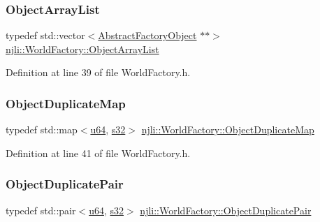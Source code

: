 \subsubsection{\texorpdfstring{Object\+Array\+List}{ObjectArrayList}}
{\footnotesize\ttfamily typedef std\+::vector$<$\mbox{\hyperlink{classnjli_1_1_abstract_factory_object}{Abstract\+Factory\+Object}} $\ast$$\ast$$>$ \mbox{\hyperlink{classnjli_1_1_world_factory_a0b1357052d11887d1561fbd882acd177}{njli\+::\+World\+Factory\+::\+Object\+Array\+List}}}



Definition at line 39 of file World\+Factory.\+h.

\mbox{\label{classnjli_1_1_world_factory_a15eec8c4710c8ec66e7cd06dd2327be6}} 
\subsubsection{\texorpdfstring{Object\+Duplicate\+Map}{ObjectDuplicateMap}}
{\footnotesize\ttfamily typedef std\+::map$<$\mbox{\hyperlink{_util_8h_ad758b7a5c3f18ed79d2fcd23d9f16357}{u64}}, \mbox{\hyperlink{_util_8h_aa62c75d314a0d1f37f79c4b73b2292e2}{s32}}$>$ \mbox{\hyperlink{classnjli_1_1_world_factory_a15eec8c4710c8ec66e7cd06dd2327be6}{njli\+::\+World\+Factory\+::\+Object\+Duplicate\+Map}}}



Definition at line 41 of file World\+Factory.\+h.

\mbox{\label{classnjli_1_1_world_factory_af17ac95ff692d4a098f82e45d135281f}} 
\subsubsection{\texorpdfstring{Object\+Duplicate\+Pair}{ObjectDuplicatePair}}
{\footnotesize\ttfamily typedef std\+::pair$<$\mbox{\hyperlink{_util_8h_ad758b7a5c3f18ed79d2fcd23d9f16357}{u64}}, \mbox{\hyperlink{_util_8h_aa62c75d314a0d1f37f79c4b73b2292e2}{s32}}$>$ \mbox{\hyperlink{classnjli_1_1_world_factory_af17ac95ff692d4a098f82e45d135281f}{njli\+::\+World\+Factory\+::\+Object\+Duplicate\+Pair}}}



